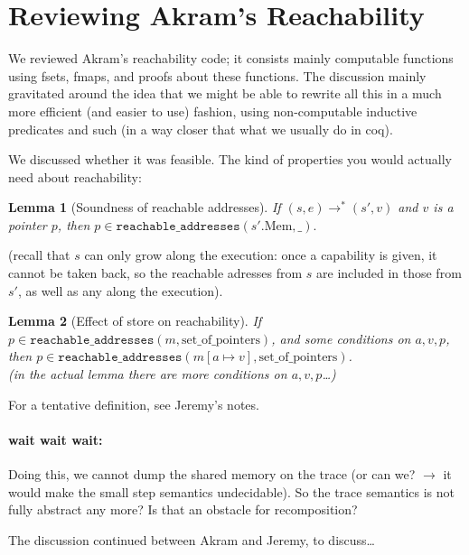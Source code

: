 \documentclass[12pt,a4paper]{article}
\newtheorem{lemma}{Lemma}
\newcommand{\Mem}{\text{Mem}}
\begin{document}
\section{Reviewing Akram's Reachability}

We reviewed Akram's reachability code; 
it consists mainly computable functions using fsets, fmaps, and 
proofs about these functions.
The discussion mainly gravitated 
around the idea that we might be able to rewrite all this 
in  a much more efficient (and easier to use) fashion, 
using non-computable inductive predicates and such (in a way closer 
that what we usually do in coq). 

We discussed whether it was feasible. 
The kind of properties you would actually need about 
reachability:
\begin{lemma}[Soundness of reachable addresses]
If $(s,e)\rightarrow^* (s',v)$ and $v$ is a pointer $p$, then $p\in \mathtt{reachable\_addresses}(s'.\Mem,\_).$
\end{lemma}
(recall that $s$ can only grow along the execution: once a capability is given, 
it cannot be taken back, so the reachable adresses from $s$ are included in those from $s'$, 
as well as any along the execution).

\begin{lemma}[Effect of store on reachability]
If $p\in \mathtt{reachable\_addresses}(m,\text{set\_of\_pointers})$, and some conditions on $a,v,p$, 
then $p\in \mathtt{reachable\_addresses}(m[a\mapsto v],\text{set\_of\_pointers})$.\\
(in the actual lemma there are more conditions on $a,v,p$\dots)
\end{lemma}


For a tentative definition, see Jeremy's notes.


\paragraph{wait wait wait:}Doing this, we cannot dump the shared memory on the trace (or can we? $\rightarrow$ it would make 
the small step semantics undecidable). So the trace semantics is not 
fully abstract any more? Is that an obstacle for recomposition?  

The discussion continued between Akram and Jeremy, to discuss\dots
\end{document}
